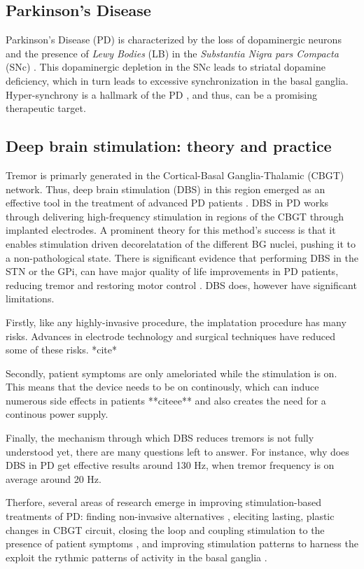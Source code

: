 \subsection{Parkinson's Disease}
Parkinson's Disease (PD) is characterized by the loss of dopaminergic neurons and the presence of
\emph{Lewy Bodies} (LB) in the \emph{Substantia Nigra pars Compacta} (SNc)
\cite{del2018advances}. This dopaminergic depletion in the SNc leads to striatal dopamine
deficiency, which in turn leads to excessive synchronization in the basal ganglia.
Hyper-synchrony is a hallmark of the PD \cite{hammond2007pathological, helmich2012cerebral},
and thus, can be a promising therapeutic target.

\subsection{Deep brain stimulation: theory and practice}
Tremor is primarly generated in the Cortical-Basal Ganglia-Thalamic (CBGT) network.
Thus, deep brain stimulation (DBS) in this region emerged as an effective tool in
the treatment of advanced PD patients \cite{del2018advances}.
DBS in PD works through delivering high-frequency stimulation in regions of the CBGT
through implanted electrodes.
A prominent theory for this method's success is that it enables stimulation driven
decorelatation of the different BG nuclei, pushing it to a non-pathological state.
There is significant evidence that performing DBS in the STN or the GPi, can have major quality
of life improvements in PD patients, reducing tremor and restoring motor control
\cite{rodriguez2005bilateral, rubin2004high}.
DBS does, however have significant limitations.

Firstly, like any highly-invasive procedure, the implatation procedure has many risks.
Advances in electrode technology and surgical techniques have reduced some of these risks.
*cite*

Secondly, patient symptoms are only ameloriated while the stimulation is on. This means that
the device needs to be on continously, which can induce numerous side effects in patients
**citeee** and also creates the need for a continous power supply.

Finally, the mechanism through which DBS reduces tremors is not fully understood yet, there
are many questions left to answer. For instance, why does DBS in PD get effective results around
130 Hz, when tremor frequency is on average around 20 Hz.

Therfore, several areas of research emerge in improving stimulation-based treatments of PD:
finding non-invasive alternatives \cite{saturnino2017target, schwab2020spike}, eleciting lasting,
plastic changes in CBGT circuit, closing the loop and coupling stimulation to the presence of
patient symptoms \cite{beudel2018adaptive}, and improving stimulation patterns to harness the
exploit the rythmic patterns of activity in the basal ganglia \cite{cagnan2017stimulating, west2022stimulating}.


